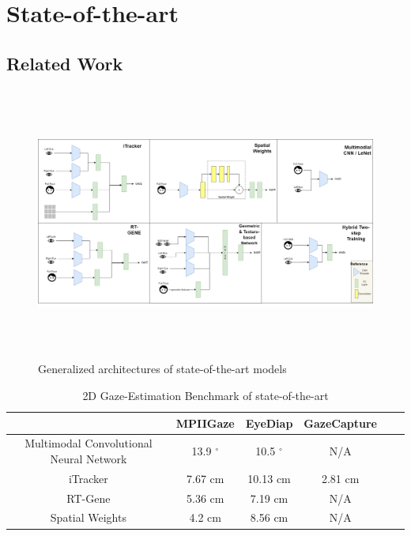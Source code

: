 
\chapter{State-of-the-art}
\label{Chap2}


\section{Related Work}

\begin{figure}
    \centering
    \includegraphics[width=\textwidth,height=9cm]{img/figures/gaze-architectures.png}
    \caption{Generalized architectures of state-of-the-art models}
    \label{architectures_comparison}
 \end{figure}

 \begin{table}[h!]
    \caption[2D Gaze-Estimation Benchmark of state-of-the-art]{2D Gaze-Estimation Benchmark of state-of-the-art}
    \centering
    \label{tab:architectures}
    \begin{tabulary}{\textwidth}{CCCCCC}
        \hline
         & MPIIGaze & EyeDiap & GazeCapture\\\hline\hline
        Multimodal Convolutional Neural Network & 13.9 $^{\circ}$ & 10.5 $^{\circ}$ & N/A \\\hline
        iTracker & 7.67 cm & 10.13 cm & 2.81 cm \\\hline
        RT-Gene & 5.36 cm & 7.19 cm & N/A \\\hline
        Spatial Weights & 4.2 cm & 8.56 cm & N/A \\\hline
        \end{tabulary}
\end{table}

